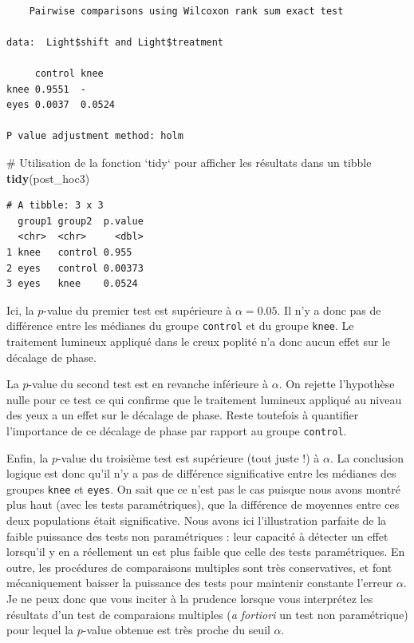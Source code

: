 \documentclass[
  a4paper,
]{article}
\newenvironment{Shaded}{\begin{snugshade}}{\end{snugshade}}
\newcommand{\CommentTok}[1]{\textcolor[rgb]{0.54,0.53,0.53}{#1}}
\newcommand{\KeywordTok}[1]{\textcolor[rgb]{0.12,0.11,0.11}{\textbf{#1}}}
\newcommand{\NormalTok}[1]{\textcolor[rgb]{0.12,0.11,0.11}{#1}}
\begin{document}
\begin{verbatim}

    Pairwise comparisons using Wilcoxon rank sum exact test 

data:  Light$shift and Light$treatment 

     control knee  
knee 0.9551  -     
eyes 0.0037  0.0524

P value adjustment method: holm 
\end{verbatim}

\begin{Shaded}
\begin{Highlighting}[]
\CommentTok{# Utilisation de la fonction `tidy` pour afficher les résultats dans un tibble}
\KeywordTok{tidy}\NormalTok{(post_hoc3)}
\end{Highlighting}
\end{Shaded}

\begin{verbatim}
# A tibble: 3 x 3
  group1 group2  p.value
  <chr>  <chr>     <dbl>
1 knee   control 0.955  
2 eyes   control 0.00373
3 eyes   knee    0.0524 
\end{verbatim}

Ici, la \(p\)-value du premier test est supérieure à \(\alpha = 0.05\). Il n'y a donc pas de différence entre les médianes du groupe \texttt{control} et du groupe \texttt{knee}. Le traitement lumineux appliqué dans le creux poplité n'a donc aucun effet sur le décalage de phase.

La \(p\)-value du second test est en revanche inférieure à \(\alpha\). On rejette l'hypothèse nulle pour ce test ce qui confirme que le traitement lumineux appliqué au niveau des yeux a un effet sur le décalage de phase. Reste toutefois à quantifier l'importance de ce décalage de phase par rapport au groupe \texttt{control}.

Enfin, la \(p\)-value du troisième test est supérieure (tout juste !) à \(\alpha\). La conclusion logique est donc qu'il n'y a pas de différence significative entre les médianes des groupes \texttt{knee} et \texttt{eyes}. On sait que ce n'est pas le cas puisque nous avons montré plus haut (avec les tests paramétriques), que la différence de moyennes entre ces deux populations était significative. Nous avons ici l'illustration parfaite de la faible puissance des tests non paramétriques : leur capacité à détecter un effet lorsqu'il y en a réellement un est plus faible que celle des tests paramétriques. En outre, les procédures de comparaisons multiples sont très conservatives, et font mécaniquement baisser la puissance des tests pour maintenir constante l'erreur \(\alpha\). Je ne peux donc que vous inciter à la prudence lorsque vous interprétez les résultats d'un test de comparaions multiples (\emph{a fortiori} un test non paramétrique) pour lequel la \(p\)-value obtenue est très proche du seuil \(\alpha\).
\end{document}
